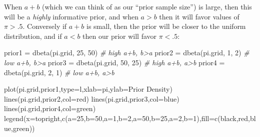 \documentclass[
]{article}
\newenvironment{Shaded}{\begin{snugshade}}{\end{snugshade}}
\newcommand{\AttributeTok}[1]{\textcolor[rgb]{0.77,0.63,0.00}{#1}}
\newcommand{\CommentTok}[1]{\textcolor[rgb]{0.56,0.35,0.01}{\textit{#1}}}
\newcommand{\DecValTok}[1]{\textcolor[rgb]{0.00,0.00,0.81}{#1}}
\newcommand{\FunctionTok}[1]{\textcolor[rgb]{0.00,0.00,0.00}{#1}}
\newcommand{\NormalTok}[1]{#1}
\newcommand{\OtherTok}[1]{\textcolor[rgb]{0.56,0.35,0.01}{#1}}
\newcommand{\StringTok}[1]{\textcolor[rgb]{0.31,0.60,0.02}{#1}}
\begin{document}
When \(a+b\) (which we can think of as our ``prior sample size'') is
large, then this will be a \emph{highly} informative prior, and when
\(a>b\) then it will favor values of \(\pi > .5\). Conversely if \(a+b\)
is small, then the prior will be closer to the uniform distribution, and
if \(a<b\) then our prior will favor \(\pi < .5\):

\begin{Shaded}
\begin{Highlighting}[]
\NormalTok{prior1 }\OtherTok{=} \FunctionTok{dbeta}\NormalTok{(pi.grid, }\DecValTok{25}\NormalTok{, }\DecValTok{50}\NormalTok{) }\CommentTok{\# high a+b, b\textgreater{}a}
\NormalTok{prior2 }\OtherTok{=} \FunctionTok{dbeta}\NormalTok{(pi.grid, }\DecValTok{1}\NormalTok{, }\DecValTok{2}\NormalTok{) }\CommentTok{\# low a+b, b\textgreater{}a}
\NormalTok{prior3 }\OtherTok{=} \FunctionTok{dbeta}\NormalTok{(pi.grid, }\DecValTok{50}\NormalTok{, }\DecValTok{25}\NormalTok{) }\CommentTok{\# high a+b, a\textgreater{}b}
\NormalTok{prior4 }\OtherTok{=} \FunctionTok{dbeta}\NormalTok{(pi.grid, }\DecValTok{2}\NormalTok{, }\DecValTok{1}\NormalTok{) }\CommentTok{\# low a+b, a\textgreater{}b}

\FunctionTok{plot}\NormalTok{(pi.grid,prior1,}\AttributeTok{type=}\StringTok{\textquotesingle{}l\textquotesingle{}}\NormalTok{,}\AttributeTok{xlab=}\StringTok{\textquotesingle{}pi\textquotesingle{}}\NormalTok{,}\AttributeTok{ylab=}\StringTok{\textquotesingle{}Prior Density\textquotesingle{}}\NormalTok{)}
\FunctionTok{lines}\NormalTok{(pi.grid,prior2,}\AttributeTok{col=}\StringTok{\textquotesingle{}red\textquotesingle{}}\NormalTok{)}
\FunctionTok{lines}\NormalTok{(pi.grid,prior3,}\AttributeTok{col=}\StringTok{\textquotesingle{}blue\textquotesingle{}}\NormalTok{)}
\FunctionTok{lines}\NormalTok{(pi.grid,prior4,}\AttributeTok{col=}\StringTok{\textquotesingle{}green\textquotesingle{}}\NormalTok{)}
\FunctionTok{legend}\NormalTok{(}\AttributeTok{x=}\StringTok{\textquotesingle{}topright\textquotesingle{}}\NormalTok{,}\FunctionTok{c}\NormalTok{(}\StringTok{\textquotesingle{}a=25,b=50\textquotesingle{}}\NormalTok{,}\StringTok{\textquotesingle{}a=1,b=2\textquotesingle{}}\NormalTok{,}\StringTok{\textquotesingle{}a=50,b=25\textquotesingle{}}\NormalTok{,}\StringTok{\textquotesingle{}a=2,b=1\textquotesingle{}}\NormalTok{),}\AttributeTok{fill=}\FunctionTok{c}\NormalTok{(}\StringTok{\textquotesingle{}black\textquotesingle{}}\NormalTok{,}\StringTok{\textquotesingle{}red\textquotesingle{}}\NormalTok{,}\StringTok{\textquotesingle{}blue\textquotesingle{}}\NormalTok{,}\StringTok{\textquotesingle{}green\textquotesingle{}}\NormalTok{))}
\end{Highlighting}
\end{Shaded}
\end{document}
